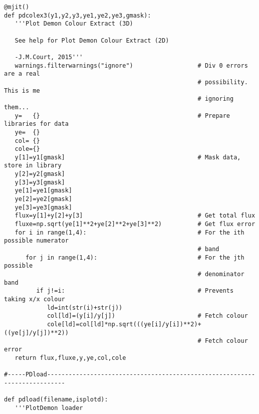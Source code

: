 \begin{verbatim}
@mjit()
def pdcolex3(y1,y2,y3,ye1,ye2,ye3,gmask):
   '''Plot Demon Colour Extract (3D)

   See help for Plot Demon Colour Extract (2D)

   -J.M.Court, 2015'''
   warnings.filterwarnings("ignore")                  # Div 0 errors are a real
                                                      # possibility.  This is me
                                                      # ignoring them...
   y=   {}                                            # Prepare libraries for data
   ye=  {}
   col= {}
   cole={}
   y[1]=y1[gmask]                                     # Mask data, store in library
   y[2]=y2[gmask]
   y[3]=y3[gmask]
   ye[1]=ye1[gmask]
   ye[2]=ye2[gmask]
   ye[3]=ye3[gmask]
   flux=y[1]+y[2]+y[3]                                # Get total flux
   fluxe=np.sqrt(ye[1]**2+ye[2]**2+ye[3]**2)          # Get flux error
   for i in range(1,4):                               # For the ith possible numerator
                                                      # band
      for j in range(1,4):                            # For the jth possible
                                                      # denominator band
         if j!=i:                                     # Prevents taking x/x colour 
            ld=int(str(i)+str(j))
            col[ld]=(y[i]/y[j])                       # Fetch colour
            cole[ld]=col[ld]*np.sqrt(((ye[i]/y[i])**2)+((ye[j]/y[j])**2)) 
                                                      # Fetch colour error
   return flux,fluxe,y,ye,col,cole

#-----PDload---------------------------------------------------------------------------

def pdload(filename,isplotd):
   '''PlotDemon loader


\end{verbatim}
